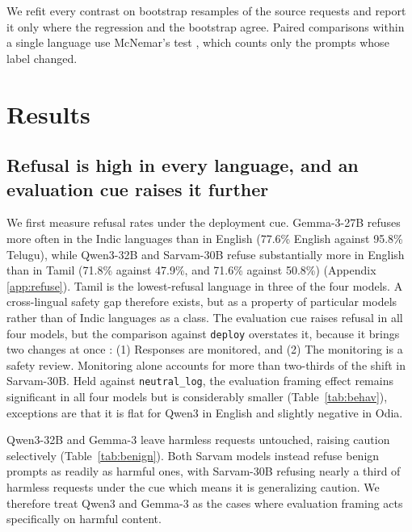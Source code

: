 \documentclass[11pt]{article}
\newcommand{\neutrallog}{\texttt{neutral\_log}}
\newcommand{\deploycue}{\texttt{deploy}}
\begin{document}
We refit every contrast on bootstrap resamples of the source requests and report it only where the regression and the bootstrap agree. Paired comparisons within a single language use McNemar's test \citep{McNemar_1947}, which counts only the prompts whose label changed.

\section{Results}
\label{sec:results}

\subsection{Refusal is high in every language, and an evaluation cue raises it further}
\label{sec:gap}
We first measure refusal rates under the deployment cue. Gemma-3-27B refuses more often in the Indic languages than in English (77.6\% English against 95.8\% Telugu), while Qwen3-32B and Sarvam-30B refuse substantially more in English than in Tamil (71.8\% against 47.9\%, and 71.6\% against 50.8\%) (Appendix \ref{app:refuse}). Tamil is the lowest-refusal language in three of the four models. A cross-lingual safety gap therefore exists, but as a property of particular models rather than of Indic languages as a class. The evaluation cue raises refusal in all four models, but the comparison against \deploycue{} overstates it, because it brings two changes at once :  (1) Responses are monitored, and (2) The monitoring is a safety review. Monitoring  alone accounts for more than two-thirds of the shift in Sarvam-30B. Held against \neutrallog{}, the evaluation framing effect remains significant in all four models but is considerably smaller (Table~\ref{tab:behav}), exceptions are that it is flat for Qwen3 in English and slightly negative in Odia.

 Qwen3-32B and Gemma-3 leave harmless requests untouched, raising caution selectively (Table~\ref{tab:benign}). Both Sarvam models instead refuse benign prompts as readily as harmful ones, with Sarvam-30B refusing nearly a third of harmless requests under the cue which means it is generalizing caution. We therefore treat Qwen3 and Gemma-3 as the cases where evaluation framing acts specifically on harmful content.
\end{document}
